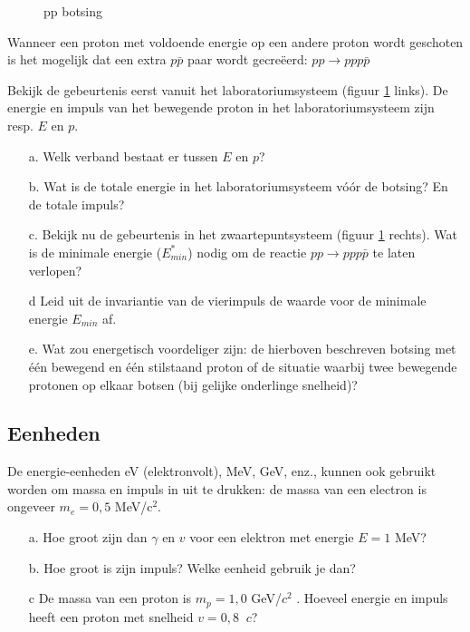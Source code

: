 \begin{figure}[ht]
\caption{pp botsing}
\label{f:ppbotsing}
\end{figure}

Wanneer een proton met voldoende energie op een andere proton wordt
geschoten is het mogelijk dat een extra $p\bar{p}$ paar wordt gecre\"{e}erd:
$pp \rightarrow ppp\bar{p}$ 

Bekijk de gebeurtenis eerst vanuit het laboratoriumsysteem
(figuur \ref{f:ppbotsing} links).
De energie en impuls van het bewegende proton in het laboratoriumsysteem 
zijn resp. $E$ en $p$.
\begin{itemize}
\item [a.]
Welk verband bestaat er tussen $E$ en $p$?
\item [b.]
Wat is de totale energie in het laboratoriumsysteem v\'{o}\'{o}r de botsing? 
En de totale impuls? 
\item [c.]
Bekijk nu de gebeurtenis in het zwaartepuntsysteem
(figuur \ref{f:ppbotsing} rechts).
Wat is de minimale energie ($E^{*}_{min}$) nodig om de 
reactie $pp \rightarrow ppp\bar{p}$
te laten verlopen?
\item [d]
Leid uit de invariantie van de vierimpuls de waarde voor de minimale 
energie $E_{min}$ af.
\item [e.]
Wat zou energetisch voordeliger zijn: 
de hierboven beschreven botsing met \'{e}\'{e}n bewegend
en \'{e}\'{e}n stilstaand proton of de situatie waarbij twee bewegende 
protonen op elkaar botsen (bij gelijke onderlinge snelheid)?
\end{itemize}

\subsection{Eenheden}
De energie-eenheden eV (elektronvolt), MeV, GeV, enz., kunnen ook gebruikt 
worden om massa en impuls in uit te drukken: de massa van een electron 
is ongeveer  $m_{e}=0,5$ MeV/c$^{2}$.
\begin{itemize}
\item [a.]
Hoe groot zijn dan $\gamma$  en $v$ voor een elektron met energie  
$E=1$ MeV? 
\item [b.]
Hoe groot is zijn impuls? Welke eenheid gebruik je dan?
\item [c]
De massa van een proton is  $m_{p}=1,0$ GeV/$c^2$ .
Hoeveel energie en impuls heeft een proton met snelheid  $v=0,8\ $ $c$?
\end{itemize}

